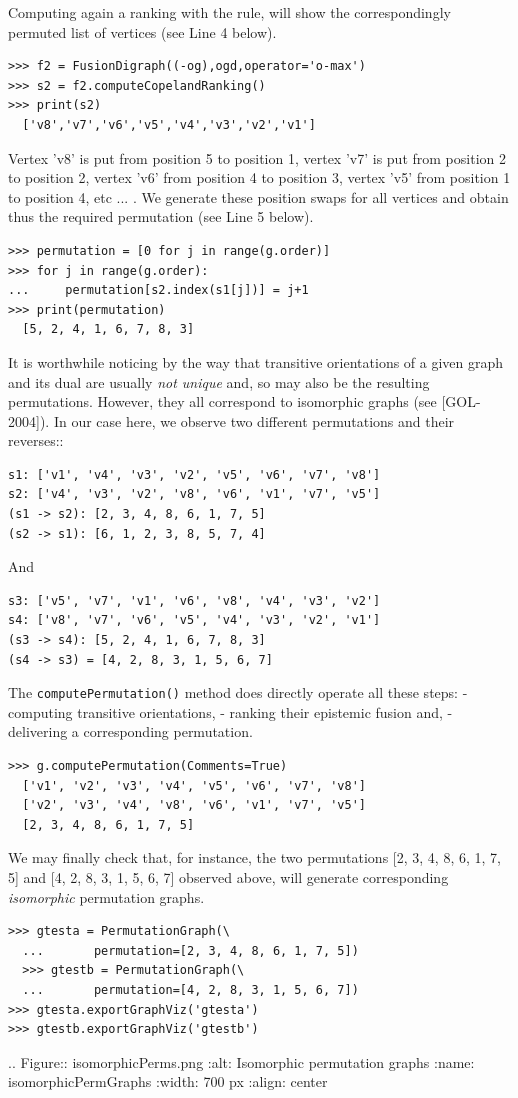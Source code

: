 Computing again a ranking with the \Copeland rule, will show the correspondingly permuted list of vertices (see Line 4 below).
\begin{lstlisting}
>>> f2 = FusionDigraph((-og),ogd,operator='o-max')
>>> s2 = f2.computeCopelandRanking()
>>> print(s2)
  ['v8','v7','v6','v5','v4','v3','v2','v1']
\end{lstlisting}
Vertex 'v8' is put from position 5 to position 1, vertex 'v7' is put from position 2 to position 2, vertex 'v6' from position 4 to position 3, vertex 'v5' from position 1 to position 4, etc ... . We generate these position swaps for all vertices and obtain thus the required permutation (see Line 5 below).
\begin{lstlisting}
>>> permutation = [0 for j in range(g.order)]
>>> for j in range(g.order):
...     permutation[s2.index(s1[j])] = j+1
>>> print(permutation)
  [5, 2, 4, 1, 6, 7, 8, 3]
\end{lstlisting}

It is worthwhile noticing by the way that transitive orientations of a given graph and its dual are usually \emph{not unique} and, so may also be the resulting permutations. However, they all correspond to isomorphic graphs (see [GOL-2004]). In our case here, we observe two different permutations and their reverses::
\begin{lstlisting}
s1: ['v1', 'v4', 'v3', 'v2', 'v5', 'v6', 'v7', 'v8']
s2: ['v4', 'v3', 'v2', 'v8', 'v6', 'v1', 'v7', 'v5']
(s1 -> s2): [2, 3, 4, 8, 6, 1, 7, 5]
(s2 -> s1): [6, 1, 2, 3, 8, 5, 7, 4]
\end{lstlisting}
And
\begin{lstlisting}  
s3: ['v5', 'v7', 'v1', 'v6', 'v8', 'v4', 'v3', 'v2']
s4: ['v8', 'v7', 'v6', 'v5', 'v4', 'v3', 'v2', 'v1']
(s3 -> s4): [5, 2, 4, 1, 6, 7, 8, 3]
(s4 -> s3) = [4, 2, 8, 3, 1, 5, 6, 7]
\end{lstlisting}
The \texttt{computePermutation()} method does directly operate all these steps: - computing transitive orientations, - ranking their epistemic fusion and, - delivering a corresponding permutation.
\begin{lstlisting}  
>>> g.computePermutation(Comments=True)
  ['v1', 'v2', 'v3', 'v4', 'v5', 'v6', 'v7', 'v8']
  ['v2', 'v3', 'v4', 'v8', 'v6', 'v1', 'v7', 'v5']
  [2, 3, 4, 8, 6, 1, 7, 5]
\end{lstlisting}

We may finally check that, for instance, the two permutations [2, 3, 4, 8, 6, 1, 7, 5] and [4, 2, 8, 3, 1, 5, 6, 7] observed above, will generate corresponding \emph{isomorphic} permutation graphs.
\begin{lstlisting}  
>>> gtesta = PermutationGraph(\
  ...       permutation=[2, 3, 4, 8, 6, 1, 7, 5])
  >>> gtestb = PermutationGraph(\
  ...       permutation=[4, 2, 8, 3, 1, 5, 6, 7])
>>> gtesta.exportGraphViz('gtesta')
>>> gtestb.exportGraphViz('gtestb')
\end{lstlisting}
.. Figure:: isomorphicPerms.png
    :alt: Isomorphic permutation graphs
    :name: isomorphicPermGraphs
    :width: 700 px
    :align: center

